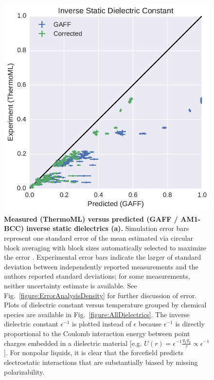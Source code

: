 \documentclass[aps,pre,twocolumn,nofootinbib,superscriptaddress,linenumbers]{revtex4-1}
\begin{document}
\begin{figure}
\includegraphics[width=\columnwidth]{./figures/dielectrics_thermoml.pdf}

\caption{{\bf Measured (ThermoML) versus predicted (GAFF / AM1-BCC) inverse static dielectrics (a).}
Simulation error bars represent one standard error of the mean estimated via circular block averaging \cite{sheppard_2015_15681} with block sizes automatically selected to maximize the error \cite{flyvbjerg1989error}.  
Experimental error bars indicate the larger of standard deviation between independently reported measurements and the authors reported standard deviations; for some measurements, neither uncertainty estimate is available.  
See Fig.~\ref{figure:ErrorAnalysisDensity} for further discussion of error.  
Plots of dielectric constant versus temperature grouped by chemical species are available in Fig.~\ref{figure:AllDielectrics}.
The inverse dielectric constant $\epsilon^{-1}$ is plotted instead of $\epsilon$ because $\epsilon^{-1}$ is directly proportional to the Coulomb interaction energy between point charges embedded in a dielectric material 
[e.g. $U(r) = \epsilon^{-1} \frac{q_1 q_2}{r} \propto \epsilon^{-1}$].  
For nonpolar liquids, it is clear that the forcefield predicts electrostatic interactions that are substantially biased by missing polarizability.
}
\label{figure:Dielectric}
\end{figure}
\end{document}
